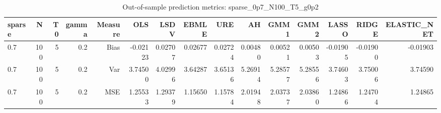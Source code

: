 \begin{table}[!htbp]\centering
\caption{Out-of-sample prediction metrics: sparse_0p7_N100_T5_g0p2}
\label{tab:table3_sparse_0p7_N100_T5_g0p2}
\begin{tabular}{lrrrrrrrrrrrrrr}
\hline
sparse & N & T0 & gamma & Measure & OLS & LSDV & EBMLE & URE & AH & GMM1 & GMM2 & LASSO & RIDGE & ELASTIC_NET \\
\hline
0.7 & 100 & 5 & 0.2 & Bias & -0.02123 & 0.02707 & 0.02677 & 0.02724 & 0.00480 & 0.00521 & 0.00503 & -0.01905 & -0.01900 & -0.01903 \\
0.7 & 100 & 5 & 0.2 & Var & 3.74500 & 4.02996 & 3.64287 & 3.65136 & 5.26914 & 5.28577 & 5.28556 & 3.74603 & 3.75006 & 3.74590 \\
0.7 & 100 & 5 & 0.2 & MSE & 1.25533 & 1.29379 & 1.15650 & 1.15784 & 2.01948 & 2.03737 & 2.03860 & 1.24866 & 1.24704 & 1.24865 \\
\hline
\end{tabular}
\end{table}


